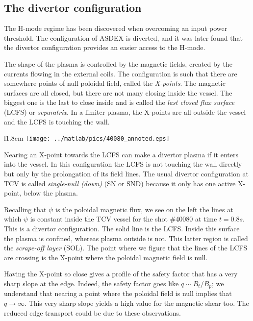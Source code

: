 \subsection{The divertor configuration}\label{sec:confinement:Hmode:divertor}
The H-mode regime has been discovered when overcoming an input power threshold. The configuration of ASDEX is diverted, and it was later found that the divertor configuration provides an easier access to the H-mode.

The shape of the plasma is controlled by the magnetic fields, created by the currents flowing in the external coils. The configuration is such that there are somewhere points of null poloidal field, called the \emph{X-points}. The magnetic surfaces are all closed, but there are not many closing inside the vessel. The biggest one is the last to close inside and is called the \emph{last closed flux surface} (LCFS) or \emph{separatrix}. In a limiter plasma, the X-points are all outside the vessel and the LCFS is touching the wall.

\begin{wrapfigure}{l}{1.8cm}
\vspace{-0.5cm}
\texttt{[image: ../matlab/pics/40080\_annoted.eps]}
\vspace{-0.5cm}
\end{wrapfigure}
Nearing an X-point towards the LCFS can make a divertor plasma if it enters into the vessel. In this configuration the LCFS is not touching the wall directly but only by the prolongation of its field lines. The usual divertor configuration at TCV is called \emph{single-null (down)} (SN or SND) because it only has one active X-point, below the plasma.

Recalling that $\psi$ is the poloidal magnetic flux, we see on the left the lines at which $\psi$ is constant inside the TCV vessel for the shot \#40080 at time $t = 0.8s$. This is a divertor configuration. The solid line is the LCFS. Inside this surface the plasma is confined, whereas plasma outside is not. This latter region is called the \emph{scrape-off layer} (SOL). The point where we figure that the lines of the LCFS are crossing is the X-point where the poloidal magnetic field is null.

Having the X-point so close gives a profile of the safety factor that has a very sharp slope at the edge. Indeed, the safety factor goes like $q \sim B_t / B_p$; we understand that nearing a point where the poloidal field is null implies that $q \rightarrow \infty$. This very sharp slope yields a high value for the magnetic shear too. The reduced edge transport could be due to these observations.

